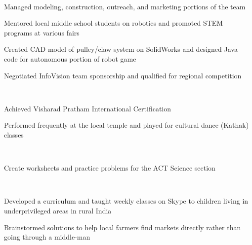\documentclass[a4paper]{MagicalCV}
\begin{document}
\begin{flushleft}
 \\
\vspace{\topsep} %
\begin{tightemize}
\item Managed modeling, construction, outreach, and marketing portions of the team
\item Mentored local middle school students on robotics and promoted STEM programs at various fairs
\item Created CAD model of pulley/claw system on SolidWorks and designed Java code for autonomous portion of robot game
\item  Negotiated InfoVision team sponsorship and qualified for regional competition
\end{tightemize}
\sectionsep 

 \\
\vspace{\topsep} %
\begin{tightemize}
\item Achieved Visharad Pratham International Certification
\item Performed frequently at the local temple and played for cultural dance (Kathak) classes
\end{tightemize}
\sectionsep

 \\
\vspace{\topsep} %
\begin{tightemize}
\item Create worksheets and practice problems for the ACT Science section
\end{tightemize}
\sectionsep

 \\
\vspace{\topsep} %
\begin{tightemize}
\item Developed a curriculum and taught weekly classes on Skype to children living in underprivileged areas in rural India
\item Brainstormed solutions to help local farmers find markets directly rather than going through a middle-man
\end{tightemize}
\sectionsep


\end{flushleft}
\end{document}
